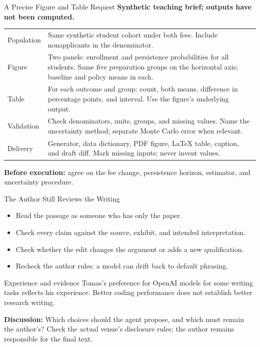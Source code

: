 \begin{frame}{A Precise Figure and Table Request}
\small
\textbf{Synthetic teaching brief; outputs have not been computed.}
\par\vspace{0.2cm}
\begin{tabular}{>{\raggedright\arraybackslash}p{2cm}>{\raggedright\arraybackslash}p{10.6cm}}
\toprule
Population & Same synthetic student cohort under both fees. Include nonapplicants in the denominator. \\
Figure & Two panels: enrollment and persistence probabilities for all students. Same five preparation groups on the horizontal axis; baseline and policy means in each. \\
Table & For each outcome and group: count, both means, difference in percentage points, and interval. Use the figure's underlying output. \\
Validation & Check denominators, units, groups, and missing values. Name the uncertainty method; separate Monte Carlo error when relevant. \\
Delivery & Generator, data dictionary, PDF figure, LaTeX table, caption, and draft diff. Mark missing inputs; never invent values. \\
\bottomrule
\end{tabular}
\par\vspace{0.2cm}
\normalsize \textbf{Before execution:} agree on the fee change, persistence horizon, estimator, and uncertainty procedure.
\end{frame}

\begin{frame}{The Author Still Reviews the Writing}
\begin{itemize}\setlength{\itemsep}{0.25cm}
\item Read the passage as someone who has only the paper.
\item Check every claim against the source, exhibit, and intended interpretation.
\item Check whether the edit changes the argument or adds a new qualification.
\item Recheck the author rules: a model can drift back to default phrasing.
\end{itemize}
\par\vspace{0.25cm}
\begin{block}{Experience and evidence}
Tomas's preference for OpenAI models for some writing tasks reflects his experience. Better coding performance does not establish better research writing.
\end{block}
\small \textbf{Discussion:} Which choices should the agent propose, and which must remain the author's? Check the actual venue's disclosure rules; the author remains responsible for the final text.
\end{frame}

